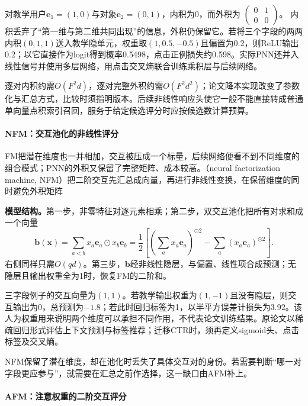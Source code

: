 对教学用户$\bm e_1=(1,0)$与对象$\bm e_2=(0,1)$，内积为0，而外积为
$\left(\begin{smallmatrix}0&1\\0&0\end{smallmatrix}\right)$。
内积丢弃了“第一维与第二维共同出现”的信息，外积仍保留它。若将三个字段的两两内积$(0,1,1)$送入教学隐单元，权重取$(1,0.5,-0.5)$且偏置为0.2，则ReLU输出0.2；以它直接作为logit得到概率0.5498，点击正例损失约0.598。实际PNN还并入线性信号并使用多层网络，用点击交叉熵联合训练乘积层与后续网络。

逐对内积约需$O(F^2d)$，逐对完整外积约需$O(F^2d^2)$；论文降本实现改变了参数化与汇总方式，比较时须指明版本。后续非线性响应头使它一般不能直接转成普通单向量点积索引召回，服务于给定候选评分时应按候选数计算预算。

\paragraph{NFM：交互池化的非线性评分}
\label{sec:rs-nfm}

FM把潜在维度也一并相加，交互被压成一个标量，后续网络便看不到不同维度的组合模式；PNN的外积又保留了完整矩阵、成本较高。（neural factorization machine, NFM）把二阶交互先汇总成向量，再进行非线性变换，在保留维度的同时避免外积矩阵

\textbf{模型结构。}第一步，非零特征对逐元素相乘；第二步，双交互池化把所有对求和成一个向量
\begin{equation}
 \bm b(\bm x)=\sum_{a<b}x_a\bm e_a\odot x_b\bm e_b
 =\frac12\left[
 \left(\sum_a x_a\bm e_a\right)^{\odot2}
 -\sum_a(x_a\bm e_a)^{\odot2}\right].
 \label{eq:rs-nfm}
\end{equation}
右侧同样只需$O(qd)$。第三步，$\bm b$经非线性隐层，与偏置、线性项合成预测；无隐层且输出权重全为1时，恢复FM的二阶和。

三字段例子的交互向量为$(1,1)$。若教学输出权重为$(1,-1)$且没有隐层，则交互输出为0，总预测为$-1.8$；若此时回归标签为1，以半平方误差计损失为3.92。该人为权重用来说明两个维度可以承担不同作用，不代表论文训练结果。原论文以稀疏回归形式评估上下文预测与标签推荐；迁移CTR时，须再定义sigmoid头、点击标签及交叉熵。

NFM保留了潜在维度，却在池化时丢失了具体交互对的身份。若需要判断“哪一对字段更应参与”，就需要在汇总之前作选择，这一缺口由AFM补上。

\Needspace{90mm}
\paragraph{AFM：注意权重的二阶交互评分}
\label{sec:rs-afm}

